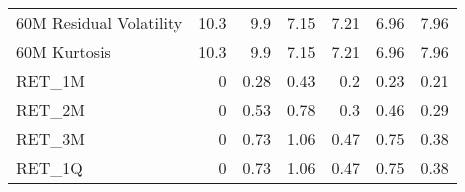 \begin{tabular}{lrrrrrr}
 60M Residual Volatility             &       10.3  &        9.9  &        7.15 &        7.21 &        6.96 &        7.96 \\
 60M Kurtosis                        &       10.3  &        9.9  &        7.15 &        7.21 &        6.96 &        7.96 \\
 RET\_1M                              &        0    &        0.28 &        0.43 &        0.2  &        0.23 &        0.21 \\
 RET\_2M                              &        0    &        0.53 &        0.78 &        0.3  &        0.46 &        0.29 \\
 RET\_3M                              &        0    &        0.73 &        1.06 &        0.47 &        0.75 &        0.38 \\
 RET\_1Q                              &        0    &        0.73 &        1.06 &        0.47 &        0.75 &        0.38 \\
\hline
\end{tabular}